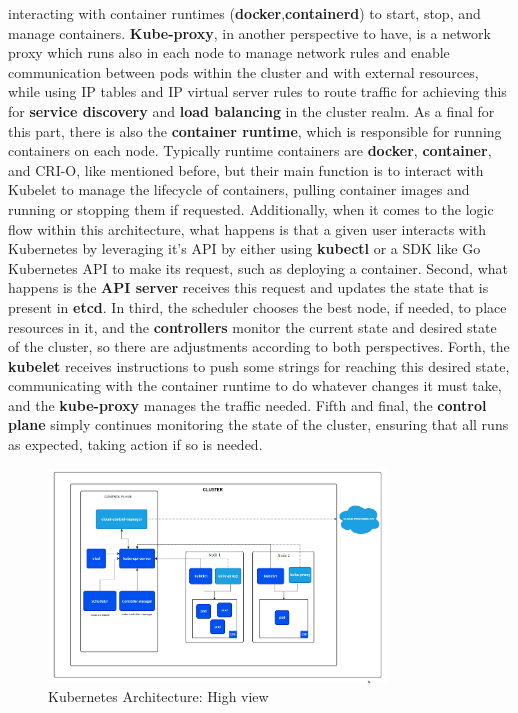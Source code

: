 interacting with container runtimes (\textbf{docker},\textbf{containerd}) to start, stop, and manage containers. \textbf{Kube-proxy}, in another perspective to have, is a network proxy which runs also in each node to manage network rules and enable communication between pods within the cluster and with external resources, while using IP tables and IP virtual server rules to route traffic for achieving this for \textbf{service discovery} and \textbf{load balancing} in the cluster realm. As a final for this part, there is also the \textbf{container runtime}, which is responsible for running containers on each node. Typically runtime containers are \textbf{docker}, \textbf{container}, and CRI-O, like mentioned before, but their main function is to interact with Kubelet to manage the lifecycle of containers, pulling container images and running or stopping them if requested. Additionally, when it comes to the logic flow within this architecture, what happens is that a given user interacts with Kubernetes by leveraging it's API by either using \textbf{kubectl} or a SDK like Go Kubernetes API to make its request, such as deploying a container. Second, what happens is the \textbf{API server} receives this request and updates the state that is present in \textbf{etcd}. In third, the scheduler chooses the best node, if needed, to place resources in it, and the \textbf{controllers} monitor the current state and desired state of the cluster, so there are adjustments according to both perspectives. Forth, the \textbf{kubelet} receives instructions to push some strings for reaching this desired state, communicating with the container runtime to do whatever changes it must take, and the \textbf{kube-proxy} manages the traffic needed. Fifth and final, the \textbf{control plane} simply continues monitoring the state of the cluster, ensuring that all runs as expected, taking action if so is needed.

\begin{figure}[H]
    \centering
    \includegraphics[width=0.8\textwidth]{assets/tools/kubernetes/kubernetes-architecture.png} %
    \caption{Kubernetes Architecture: High view}
    \label{fig:sample-image} 
\end{figure}

